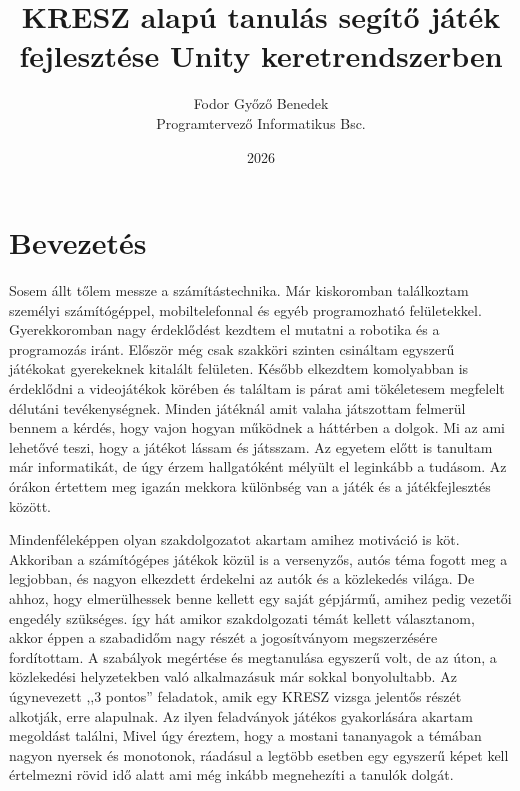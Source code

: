 \documentclass[
]{thesis-ekf}
\theoremstyle{definition}
\theoremstyle{remark}
\begin{document}
\title{KRESZ alapú tanulás segítő játék fejlesztése Unity keretrendszerben}
\author{Fodor Győző Benedek\\Programtervező Informatikus Bsc.}
\date{2026}
\maketitle

\tableofcontents

\chapter*{Bevezetés}
Sosem állt tőlem messze a számítástechnika. Már kiskoromban találkoztam személyi számítógéppel, mobiltelefonnal és egyéb programozható felületekkel. Gyerekkoromban nagy érdeklődést kezdtem el mutatni a robotika és a programozás iránt. Először még csak szakköri szinten csináltam egyszerű játékokat gyerekeknek kitalált felületen. Később elkezdtem komolyabban is érdeklődni a videojátékok körében és találtam is párat ami tökéletesem megfelelt délutáni tevékenységnek. Minden játéknál amit valaha játszottam felmerül bennem a kérdés, hogy vajon hogyan működnek a háttérben a dolgok. Mi az ami lehetővé teszi, hogy a játékot lássam és játsszam. Az egyetem előtt is tanultam már informatikát, de úgy érzem hallgatóként mélyült el leginkább a tudásom. Az órákon értettem meg igazán mekkora különbség van a játék és a játékfejlesztés között.

Mindenféleképpen olyan szakdolgozatot akartam amihez motiváció is köt. Akkoriban a számítógépes játékok közül is a versenyzős, autós téma fogott meg a legjobban, és nagyon elkezdett érdekelni az autók és a közlekedés világa. De ahhoz, hogy elmerülhessek benne kellett egy saját gépjármű, amihez pedig vezetői engedély szükséges. így hát amikor szakdolgozati témát kellett választanom, akkor éppen a szabadidőm nagy részét a jogosítványom megszerzésére fordítottam. A szabályok megértése és megtanulása egyszerű volt, de az úton, a közlekedési helyzetekben való alkalmazásuk már sokkal bonyolultabb. Az úgynevezett ,,3 pontos'' feladatok, amik egy KRESZ vizsga jelentős részét alkotják, erre alapulnak. Az ilyen feladványok játékos gyakorlására akartam megoldást találni, Mivel úgy éreztem, hogy a mostani tananyagok a témában nagyon nyersek és monotonok, ráadásul a legtöbb esetben egy egyszerű képet kell értelmezni rövid idő alatt ami még inkább megnehezíti a tanulók dolgát.
\end{document}
